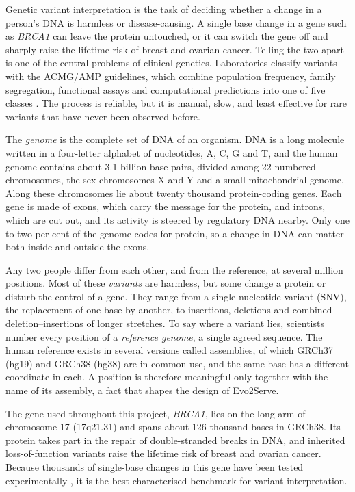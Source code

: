Genetic variant interpretation is the task of deciding whether a change in a person's DNA is harmless or disease-causing. A single base change in a gene such as \textit{BRCA1} can leave the protein untouched, or it can switch the gene off and sharply raise the lifetime risk of breast and ovarian cancer. Telling the two apart is one of the central problems of clinical genetics. Laboratories classify variants with the ACMG/AMP guidelines, which combine population frequency, family segregation, functional assays and computational predictions into one of five classes \cite{richards2015acmg}. The process is reliable, but it is manual, slow, and least effective for rare variants that have never been observed before.

The \emph{genome} is the complete set of DNA of an organism. DNA is a long molecule written in a four-letter alphabet of nucleotides, A, C, G and T, and the human genome contains about 3.1 billion base pairs, divided among 22 numbered chromosomes, the sex chromosomes X and Y and a small mitochondrial genome. Along these chromosomes lie about twenty thousand protein-coding genes. Each gene is made of exons, which carry the message for the protein, and introns, which are cut out, and its activity is steered by regulatory DNA nearby. Only one to two per cent of the genome codes for protein, so a change in DNA can matter both inside and outside the exons.

Any two people differ from each other, and from the reference, at several million positions. Most of these \emph{variants} are harmless, but some change a protein or disturb the control of a gene. They range from a single-nucleotide variant (SNV), the replacement of one base by another, to insertions, deletions and combined deletion--insertions of longer stretches. To say where a variant lies, scientists number every position of a \emph{reference genome}, a single agreed sequence. The human reference exists in several versions called assemblies, of which GRCh37 (hg19) and GRCh38 (hg38) are in common use, and the same base has a different coordinate in each. A position is therefore meaningful only together with the name of its assembly, a fact that shapes the design of Evo2Serve.

The gene used throughout this project, \textit{BRCA1}, lies on the long arm of chromosome 17 (17q21.31) and spans about 126 thousand bases in GRCh38. Its protein takes part in the repair of double-stranded breaks in DNA, and inherited loss-of-function variants raise the lifetime risk of breast and ovarian cancer. Because thousands of single-base changes in this gene have been tested experimentally \cite{findlay2018brca1}, it is the best-characterised benchmark for variant interpretation.

